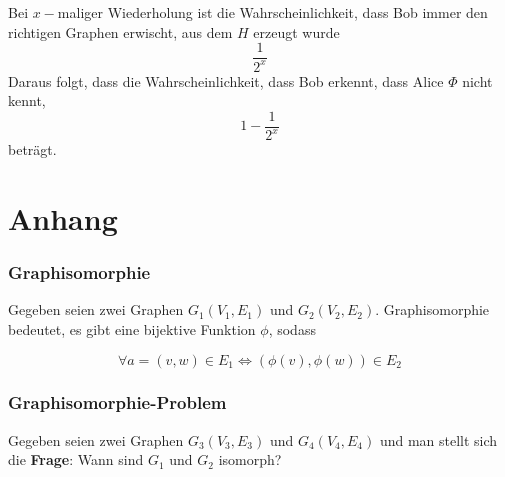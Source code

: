 \documentclass{scrartcl}%
\begin{document}
    Bei $x-$maliger Wiederholung ist die Wahrscheinlichkeit, dass Bob immer den richtigen Graphen erwischt, aus dem $H$ erzeugt wurde
    \begin{equation*}
        \frac{1}{2^x}
    \end{equation*}
    Daraus folgt, dass die Wahrscheinlichkeit, dass Bob erkennt, dass Alice $\Phi$ nicht kennt,
    \begin{equation*}
        1-\frac{1}{2^x}
    \end{equation*}
    beträgt.


    \hrulefill

    \section*{Anhang}
    \label{sec:anhang}

    \subsubsection*{Graphisomorphie}

    Gegeben seien zwei Graphen $G_1(V_1, E_1)$ und $G_2(V_2, E_2)$.
    Graphisomorphie bedeutet, es gibt eine bijektive Funktion $\phi$, sodass

    \begin{equation*}
        \forall a = (v,w) \in E_1 \Leftrightarrow (\phi(v), \phi(w)) \in E_2
    \end{equation*}

    \subsubsection*{Graphisomorphie-Problem}

    Gegeben seien zwei Graphen $G_3(V_3, E_3)$ und $G_4(V_4, E_4)$ und man stellt sich die \textbf{\textsf{Frage}}:
    Wann sind $G_1$ und $G_2$ isomorph?
\end{document}
